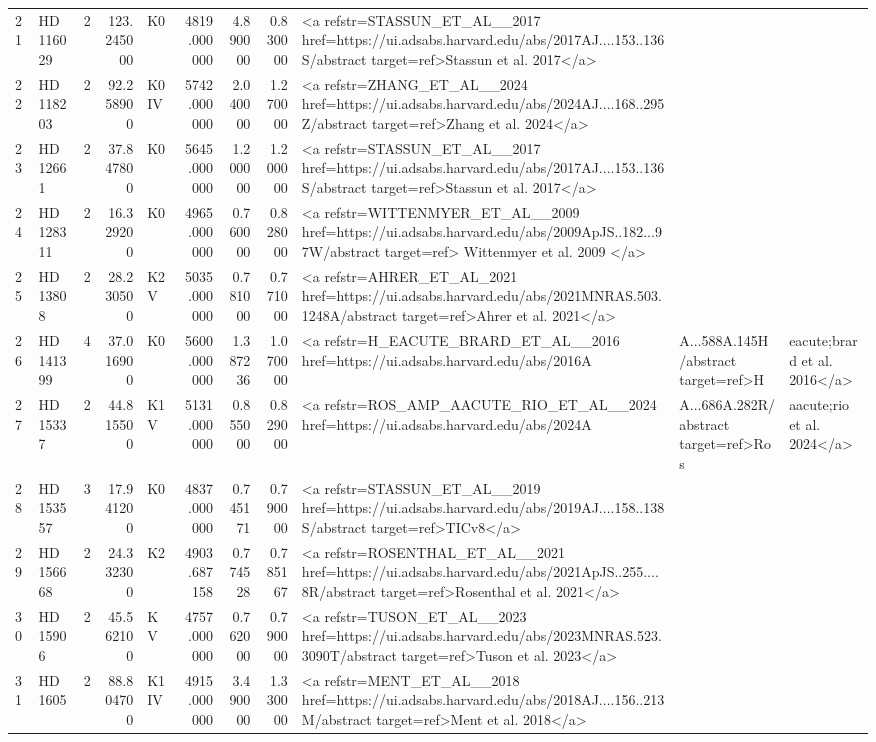 \begin{tabular}{llrrlrrrl}
21 & HD 116029 & 2 & 123.245000 & K0 & 4819.000000 & 4.890000 & 0.830000 & <a refstr=STASSUN_ET_AL__2017 href=https://ui.adsabs.harvard.edu/abs/2017AJ....153..136S/abstract target=ref>Stassun et al. 2017</a> \\
22 & HD 118203 & 2 & 92.258900 & K0 IV & 5742.000000 & 2.040000 & 1.270000 & <a refstr=ZHANG_ET_AL__2024 href=https://ui.adsabs.harvard.edu/abs/2024AJ....168..295Z/abstract target=ref>Zhang et al. 2024</a> \\
23 & HD 12661 & 2 & 37.847800 & K0 & 5645.000000 & 1.200000 & 1.200000 & <a refstr=STASSUN_ET_AL__2017 href=https://ui.adsabs.harvard.edu/abs/2017AJ....153..136S/abstract target=ref>Stassun et al. 2017</a> \\
24 & HD 128311 & 2 & 16.329200 & K0 & 4965.000000 & 0.760000 & 0.828000 & <a refstr=WITTENMYER_ET_AL__2009 href=https://ui.adsabs.harvard.edu/abs/2009ApJS..182...97W/abstract target=ref> Wittenmyer et al. 2009 </a> \\
25 & HD 13808 & 2 & 28.230500 & K2 V & 5035.000000 & 0.781000 & 0.771000 & <a refstr=AHRER_ET_AL_2021 href=https://ui.adsabs.harvard.edu/abs/2021MNRAS.503.1248A/abstract target=ref>Ahrer et al. 2021</a> \\
26 & HD 141399 & 4 & 37.016900 & K0 & 5600.000000 & 1.387236 & 1.070000 & <a refstr=H_EACUTE_BRARD_ET_AL__2016 href=https://ui.adsabs.harvard.edu/abs/2016A&A...588A.145H/abstract target=ref>H&eacute;brard et al. 2016</a> \\
27 & HD 15337 & 2 & 44.815500 & K1 V & 5131.000000 & 0.855000 & 0.829000 & <a refstr=ROS_AMP_AACUTE_RIO_ET_AL__2024 href=https://ui.adsabs.harvard.edu/abs/2024A&A...686A.282R/abstract target=ref>Ros&aacute;rio et al. 2024</a> \\
28 & HD 153557 & 3 & 17.941200 & K0 & 4837.000000 & 0.745171 & 0.790000 & <a refstr=STASSUN_ET_AL__2019 href=https://ui.adsabs.harvard.edu/abs/2019AJ....158..138S/abstract target=ref>TICv8</a> \\
29 & HD 156668 & 2 & 24.332300 & K2 & 4903.687158 & 0.774528 & 0.785167 & <a refstr=ROSENTHAL_ET_AL__2021 href=https://ui.adsabs.harvard.edu/abs/2021ApJS..255....8R/abstract target=ref>Rosenthal et al. 2021</a> \\
30 & HD 15906 & 2 & 45.562100 & K V & 4757.000000 & 0.762000 & 0.790000 & <a refstr=TUSON_ET_AL__2023 href=https://ui.adsabs.harvard.edu/abs/2023MNRAS.523.3090T/abstract target=ref>Tuson et al. 2023</a> \\
31 & HD 1605 & 2 & 88.804700 & K1 IV & 4915.000000 & 3.490000 & 1.330000 & <a refstr=MENT_ET_AL__2018 href=https://ui.adsabs.harvard.edu/abs/2018AJ....156..213M/abstract target=ref>Ment et al. 2018</a> \\

\end{tabular}
